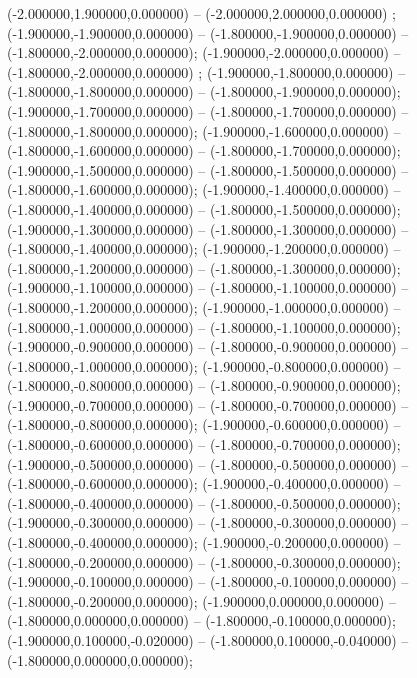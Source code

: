  (-2.000000,1.900000,0.000000) -- (-2.000000,2.000000,0.000000) ;
 (-1.900000,-1.900000,0.000000) -- (-1.800000,-1.900000,0.000000) -- (-1.800000,-2.000000,0.000000);
 (-1.900000,-2.000000,0.000000) -- (-1.800000,-2.000000,0.000000) ;
 (-1.900000,-1.800000,0.000000) -- (-1.800000,-1.800000,0.000000) -- (-1.800000,-1.900000,0.000000);
 (-1.900000,-1.700000,0.000000) -- (-1.800000,-1.700000,0.000000) -- (-1.800000,-1.800000,0.000000);
 (-1.900000,-1.600000,0.000000) -- (-1.800000,-1.600000,0.000000) -- (-1.800000,-1.700000,0.000000);
 (-1.900000,-1.500000,0.000000) -- (-1.800000,-1.500000,0.000000) -- (-1.800000,-1.600000,0.000000);
 (-1.900000,-1.400000,0.000000) -- (-1.800000,-1.400000,0.000000) -- (-1.800000,-1.500000,0.000000);
 (-1.900000,-1.300000,0.000000) -- (-1.800000,-1.300000,0.000000) -- (-1.800000,-1.400000,0.000000);
 (-1.900000,-1.200000,0.000000) -- (-1.800000,-1.200000,0.000000) -- (-1.800000,-1.300000,0.000000);
 (-1.900000,-1.100000,0.000000) -- (-1.800000,-1.100000,0.000000) -- (-1.800000,-1.200000,0.000000);
 (-1.900000,-1.000000,0.000000) -- (-1.800000,-1.000000,0.000000) -- (-1.800000,-1.100000,0.000000);
 (-1.900000,-0.900000,0.000000) -- (-1.800000,-0.900000,0.000000) -- (-1.800000,-1.000000,0.000000);
 (-1.900000,-0.800000,0.000000) -- (-1.800000,-0.800000,0.000000) -- (-1.800000,-0.900000,0.000000);
 (-1.900000,-0.700000,0.000000) -- (-1.800000,-0.700000,0.000000) -- (-1.800000,-0.800000,0.000000);
 (-1.900000,-0.600000,0.000000) -- (-1.800000,-0.600000,0.000000) -- (-1.800000,-0.700000,0.000000);
 (-1.900000,-0.500000,0.000000) -- (-1.800000,-0.500000,0.000000) -- (-1.800000,-0.600000,0.000000);
 (-1.900000,-0.400000,0.000000) -- (-1.800000,-0.400000,0.000000) -- (-1.800000,-0.500000,0.000000);
 (-1.900000,-0.300000,0.000000) -- (-1.800000,-0.300000,0.000000) -- (-1.800000,-0.400000,0.000000);
 (-1.900000,-0.200000,0.000000) -- (-1.800000,-0.200000,0.000000) -- (-1.800000,-0.300000,0.000000);
 (-1.900000,-0.100000,0.000000) -- (-1.800000,-0.100000,0.000000) -- (-1.800000,-0.200000,0.000000);
 (-1.900000,0.000000,0.000000) -- (-1.800000,0.000000,0.000000) -- (-1.800000,-0.100000,0.000000);
 (-1.900000,0.100000,-0.020000) -- (-1.800000,0.100000,-0.040000) -- (-1.800000,0.000000,0.000000);

